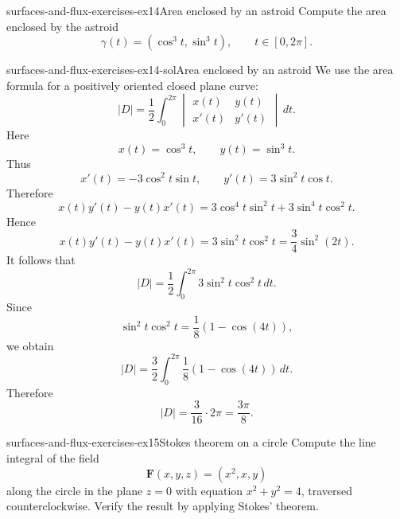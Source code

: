 \documentclass[preview]{standalone}
\begin{document}
\begin{snippetexercise}{surfaces-and-flux-exercises-ex14}{Area enclosed by an astroid}
    Compute the area enclosed by the astroid \[\gamma(t)=\left(\cos^3 t,\sin^3 t\right),\qquad t\in[0,2\pi].\]
\end{snippetexercise}

\begin{snippetsolution}{surfaces-and-flux-exercises-ex14-sol}{Area enclosed by an astroid}
    We use the area formula for a positively oriented closed plane curve:
    \[
        |D|
        =
        \frac{1}{2}\int_0^{2\pi}
        \begin{vmatrix}
            x(t) & y(t) \\
            x'(t) & y'(t)
        \end{vmatrix}
        \,dt.
    \]
    Here
    \[
        x(t)=\cos^3 t,
        \qquad
        y(t)=\sin^3 t.
    \]
    Thus
    \[
        x'(t)=-3\cos^2 t\sin t,
        \qquad
        y'(t)=3\sin^2 t\cos t.
    \]
    Therefore
    \[
        x(t)y'(t)-y(t)x'(t)
        =
        3\cos^4 t\sin^2 t
        +
        3\sin^4 t\cos^2 t.
    \]
    Hence
    \[
        x(t)y'(t)-y(t)x'(t)
        =
        3\sin^2 t\cos^2 t
        =
        \frac{3}{4}\sin^2(2t).
    \]
    It follows that
    \[
        |D|
        =
        \frac{1}{2}
        \int_0^{2\pi}
        3\sin^2 t\cos^2 t
        \,dt.
    \]
    Since
    \[
        \sin^2 t\cos^2 t=\frac{1}{8}\left(1-\cos(4t)\right),
    \]
    we obtain
    \[
        |D|
        =
        \frac{3}{2}
        \int_0^{2\pi}
        \frac{1}{8}\left(1-\cos(4t)\right)
        \,dt.
    \]
    Therefore
    \[
        |D|
        =
        \frac{3}{16}\cdot 2\pi
        =
        \frac{3\pi}{8}.
    \]
\end{snippetsolution}

\begin{snippetexercise}{surfaces-and-flux-exercises-ex15}{Stokes theorem on a circle}
    Compute the line integral of the field \[\mathbf{F}(x,y,z)=\left(x^2,x,y\right)\] along the circle in the plane \(z=0\) with equation \(x^2+y^2=4\), traversed counterclockwise. Verify the result by applying Stokes' theorem.
\end{snippetexercise}
\end{document}
